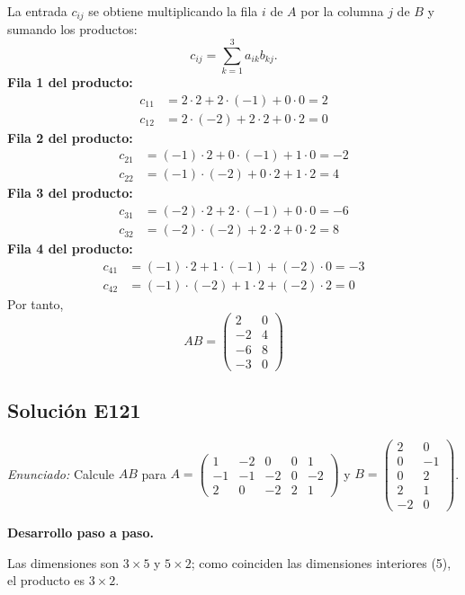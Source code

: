 \documentclass[12pt]{article}
\theoremstyle{remark}
\newcommand{\solucion}[2]{\Needspace{11\baselineskip}\subsection*{Solución E#1}\noindent\textit{Enunciado:} #2\par\medskip\noindent\textbf{Desarrollo paso a paso.}\par\medskip}
\begin{document}
La entrada $c_{ij}$ se obtiene multiplicando la fila $i$ de $A$ por la columna $j$ de $B$ y sumando los productos:
\[
c_{ij}=\sum_{k=1}^{3} a_{ik}b_{kj}.
\]
\textbf{Fila 1 del producto:}
\[
\begin{aligned}c_{11}&=2\cdot 2+2\cdot (-1)+0\cdot 0=2\\c_{12}&=2\cdot (-2)+2\cdot 2+0\cdot 2=0\end{aligned}
\]
\textbf{Fila 2 del producto:}
\[
\begin{aligned}c_{21}&=(-1)\cdot 2+0\cdot (-1)+1\cdot 0=-2\\c_{22}&=(-1)\cdot (-2)+0\cdot 2+1\cdot 2=4\end{aligned}
\]
\textbf{Fila 3 del producto:}
\[
\begin{aligned}c_{31}&=(-2)\cdot 2+2\cdot (-1)+0\cdot 0=-6\\c_{32}&=(-2)\cdot (-2)+2\cdot 2+0\cdot 2=8\end{aligned}
\]
\textbf{Fila 4 del producto:}
\[
\begin{aligned}c_{41}&=(-1)\cdot 2+1\cdot (-1)+(-2)\cdot 0=-3\\c_{42}&=(-1)\cdot (-2)+1\cdot 2+(-2)\cdot 2=0\end{aligned}
\]
Por tanto,
\[
\boxed{AB=\begin{pmatrix}2&0\\-2&4\\-6&8\\-3&0\end{pmatrix}}
\]

\medskip

\solucion{121}{Calcule $AB$ para $A=\begin{pmatrix}1&-2&0&0&1\\-1&-1&-2&0&-2\\2&0&-2&2&1\end{pmatrix}$ y $B=\begin{pmatrix}2&0\\0&-1\\0&2\\2&1\\-2&0\end{pmatrix}$.}
Las dimensiones son $3\times5$ y $5\times2$; como coinciden las dimensiones interiores (5), el producto es $3\times2$.
\end{document}
